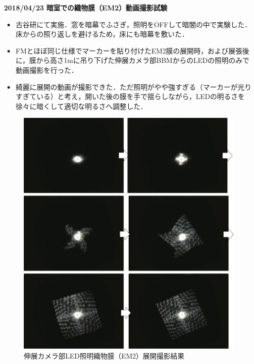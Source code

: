\noindent \textbf{2018/04/23 暗室での織物膜（EM2）動画撮影試験}
\begin{itemize}
	\item 古谷研にて実施．窓を暗幕でふさぎ，照明をOFFして暗闇の中で実験した．床からの照り返しを避けるため，床にも暗幕を敷いた．
	\item FMとほぼ同じ仕様でマーカーを貼り付けたEM2膜の展開時，および展張後に，膜から高さ1mに吊り下げた伸展カメラ部BBMからのLEDの照明のみで動画撮影を行った．
	\item 綺麗に展開の動画が撮影できた．ただ照明がやや強すぎる（マーカーが光りすぎている）と考え，開いた後の膜を手で揺らしながら，LEDの明るさを徐々に暗くして適切な明るさへ調整した．
\end{itemize}
\begin{figure}[H]
	\centering
	\includegraphics[width=.8\textwidth]{03/fig/3-9-2-3-7.jpg}
	\caption{伸展カメラ部LED照明織物膜（EM2）展開撮影結果}
	\label{fig3-9-2-3-7}
\end{figure}